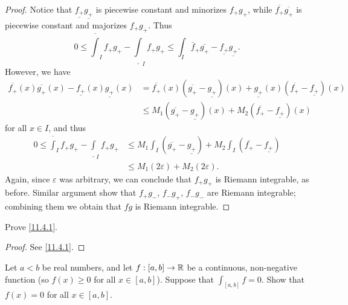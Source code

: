 \begin{proof}
  Notice that \(\underline{f_+} \underline{g_+}\) is piecewise constant and minorizes \(f_+ g_+\), while \(\overline{f_+} \overline{g_+}\) is piecewise constant and majorizes \(f_+ g_+\).
  Thus
  \[
    0 \leq \overline{\int}_I f_+ g_+ - \underline{\int}_I f_+ g_+ \leq \int_I \overline{f}_+ \overline{g_+} - \underline{f_+} \underline{g_+}.
  \]
  However, we have
  \begin{align*}
    \overline{f_+}(x) \overline{g_+}(x) - \underline{f_+}(x) \underline{g_+}(x) & = \overline{f_+}(x) (\overline{g_+} - \underline{g_+})(x) + \underline{g_+}(x) (\overline{f_+} - \underline{f_+})(x) \\
                                                                                & \leq M_1 (\overline{g_+} - \underline{g_+})(x) + M_2 (\overline{f_+} - \underline{f_+})(x)
  \end{align*}
  for all \(x \in I\), and thus
  \begin{align*}
    0 \leq \overline{\int}_I f_+ g_+ - \underline{\int}_I f_+ g_+ & \leq M_1 \int_I (\overline{g_+} - \underline{g_+}) + M_2 \int_I (\overline{f_+} - \underline{f_+}) \\
                                                                  & \leq M_1 (2\varepsilon) + M_2 (2\varepsilon).
  \end{align*}
  Again, since \(\varepsilon\) was arbitrary, we can conclude that \(f_+ g_+\) is Riemann integrable, as before.
  Similar argument show that \(f_+ g_-\), \(f_- g_+\), \(f_- g_-\) are Riemann integrable;
  combining them we obtain that \(fg\) is Riemann integrable.
\end{proof}

\exercisesection

\begin{ex}\label{ex:11.4.1}
  Prove \cref{11.4.1}.
\end{ex}

\begin{proof}
  See \cref{11.4.1}.
\end{proof}

\begin{ex}\label{ex:11.4.2}
  Let \(a < b\) be real numbers, and let \(f : [a, b] \to \mathbb{R}\) be a continuous, non-negative function
  (so \(f(x) \geq 0\) for all \(x \in [a, b]\)).
  Suppose that \(\int_{[a, b]} f = 0\).
  Show that \(f(x) = 0\) for all \(x \in [a, b]\).
\end{ex}

